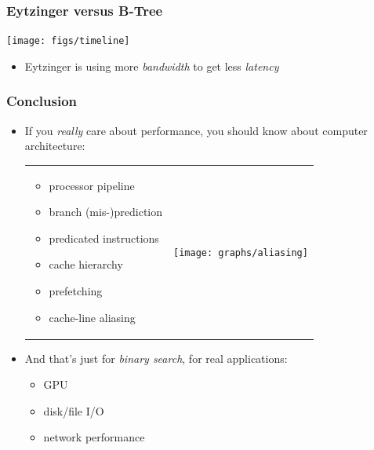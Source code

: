 \documentclass[xcolor=dvipsnames]{beamer}
\begin{document}
\begin{frame}
  \frametitle{Eytzinger versus B-Tree}

  \begin{center}
    \texttt{[image: figs/timeline]}
  \end{center}
  \vspace{-1em}
  \begin{itemize}[<2->]
     \item Eytzinger is using more \emph{bandwidth} to get less \emph{latency} 
  \end{itemize}
\end{frame}


\begin{frame}
  \frametitle{Conclusion}

  \begin{itemize}[<+->]
    \item If you \emph{really} care about performance, you should know
       about computer architecture:
  \begin{tabular}{@{}m{}m{}}
    \begin{itemize}[<+->]
     \item processor pipeline
     \item branch (mis-)prediction
     \item predicated instructions
     \item cache hierarchy
     \item prefetching
     \item cache-line aliasing 
    \end{itemize}
    &
    \texttt{[image: graphs/aliasing]}
  \end{tabular}
  \item And that's just for \emph{binary search}, for real applications:
    \begin{itemize}[<+->]
     \item GPU
     \item disk/file I/O
     \item network performance
    \end{itemize}
  \end{itemize}
\end{frame}
\end{document}
